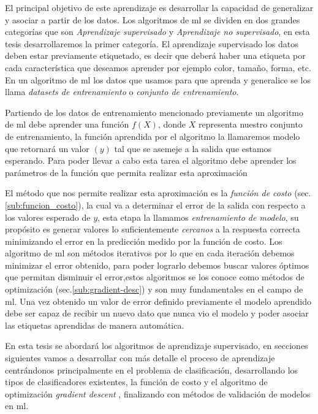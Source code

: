 El principal objetivo de este aprendizaje es desarrollar la capacidad de generalizar y asociar a partir de los datos. Los algoritmos de  \ac{ml} se dividen en dos grandes categorías que son \textit{Aprendizaje supervisado} y \textit{Aprendizaje no supervisado},  en esta tesis desarrollaremos la primer categoría.  El aprendizaje supervisado los datos deben estar previamente etiquetado, es decir que deberá haber una etiqueta por cada característica que deseamos aprender por ejemplo color, tamaño, forma, etc. En un algoritmo de \ac{ml} los datos que usamos para que aprenda y generalice se los llama \textit{datasets de entrenamiento} o \textit{conjunto de entrenamiento}.

Partiendo de los datos de entrenamiento mencionado previamente un algoritmo de \ac{ml} debe aprender una función  $ f(X)$, donde $ X$ representa nuestro conjunto de entrenamiento, la función aprendida por el algoritmo la llamaremos modelo  que retornará un valor $(y)$ tal que se asemeje a la salida que estamos esperando. Para poder llevar a cabo esta tarea el algoritmo debe aprender los parámetros de la función que permita realizar esta aproximación 

El método que nos permite realizar esta aproximación es la \textit{función de costo} (sec.\ref{sub:funcion_costo}), la cual va a  determinar el error de la salida con respecto a los valores esperado de  $y$, esta etapa la llamamos \textit{entrenamiento de modelo}, su propósito es generar valores lo suficientemente \textit{cercanos} a la respuesta correcta minimizando el error en la predicción medido por la función de costo. Los algoritmo de \ac{ml} son métodos iterativos por lo que en cada iteración debemos minimizar el error obtenido, para poder lograrlo debemos buscar valores óptimos que permitan disminuir el error,estos algoritmos se los conoce como métodos de optimización (sec.\ref{sub:gradient-desc}) y son muy fundamentales en el campo de \ac{ml}. Una vez obtenido un valor de error definido previamente el modelo aprendido debe ser capaz de recibir un nuevo dato que nunca vio el modelo y poder asociar las etiquetas aprendidas de manera automática. 

En esta tesis se abordará los algoritmos de aprendizaje supervisado, en secciones siguientes vamos a desarrollar con más detalle el proceso de aprendizaje centrándonos principalmente en el problema de clasificación, desarrollando los tipos de clasificadores existentes, la función de costo y el algoritmo de optimización \textit{gradient descent} \citep{cnns}, finalizando con métodos de validación de modelos en \ac{ml}.

